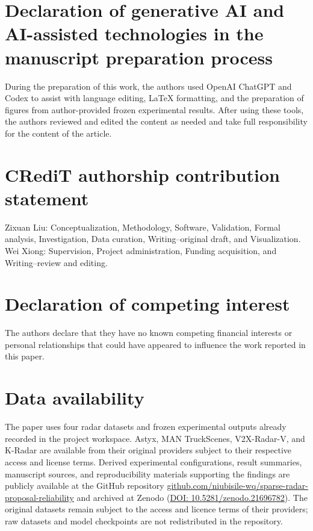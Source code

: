 \documentclass[preprint,12pt,times]{elsarticle}
\begin{document}
\section*{Declaration of generative AI and AI-assisted technologies in the
manuscript preparation process}

During the preparation of this work, the authors used OpenAI ChatGPT and Codex
to assist with language editing, LaTeX formatting, and the preparation of
figures from author-provided frozen experimental results. After using these
tools, the authors reviewed and edited the content as needed and take full
responsibility for the content of the article.

\section*{CRediT authorship contribution statement}

Zixuan Liu: Conceptualization, Methodology, Software, Validation, Formal
analysis, Investigation, Data curation, Writing--original draft, and
Visualization. Wei Xiong: Supervision, Project administration, Funding
acquisition, and Writing--review and editing.

\section*{Declaration of competing interest}

The authors declare that they have no known competing financial interests or
personal relationships that could have appeared to influence the work reported
in this paper.

\section*{Data availability}

The paper uses four radar datasets and frozen experimental outputs already
recorded in the project workspace. Astyx, MAN TruckScenes, V2X-Radar-V, and
K-Radar are available from their original providers subject to their
respective access and license terms. Derived experimental configurations,
result summaries, manuscript sources, and reproducibility materials supporting
the findings are publicly available at the GitHub repository
\href{https://github.com/niubisile-wq/sparse-radar-proposal-reliability}{github.com/niubisile-wq/sparse-radar-proposal-reliability}
and archived at Zenodo (\href{https://doi.org/10.5281/zenodo.21696782}{DOI:
10.5281/zenodo.21696782}). The original datasets remain subject to the access
and licence terms of their providers; raw datasets and model checkpoints are
not redistributed in the repository.


\end{document}
